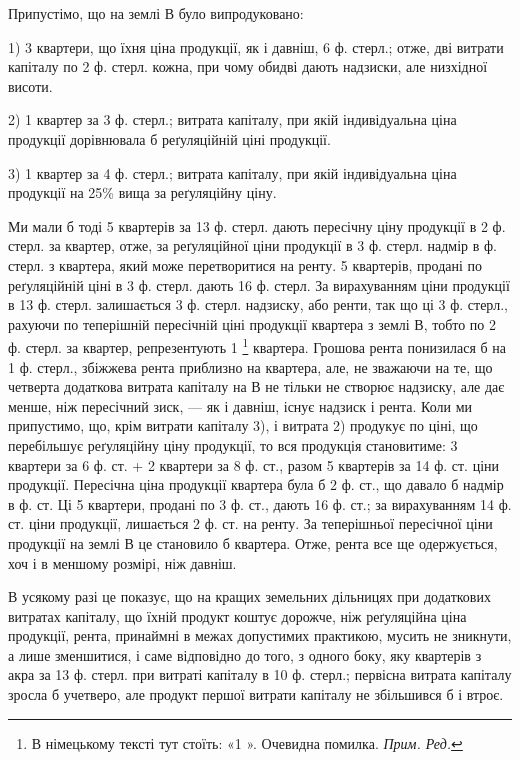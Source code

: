Припустімо, що на землі В було випродуковано:

1) 3  квартери, що їхня ціна продукції, як і давніш, 6 ф. стерл.; отже,
дві витрати капіталу по  2  ф. стерл. кожна, при чому обидві дають надзиски,
але низхідної висоти.

2) 1 квартер за 3 ф. стерл.; витрата капіталу, при якій індивідуальна
ціна продукції дорівнювала б реґуляційній ціні продукції.

3) 1 квартер за 4 ф. стерл.; витрата капіталу, при якій індивідуальна
ціна продукції на 25\% вища за реґуляційну ціну.

Ми мали б тоді 5  квартерів за 13 ф. стерл. дають пересічну ціну продукції в 2  ф. стерл.
за квартер, отже, за реґуляційної ціни продукції в 3 ф. стерл. надмір
в  ф. стерл. з квартера, який може перетворитися на ренту. 5  квартерів,
продані по реґуляційній ціні в 3 ф. стерл. дають 16  ф. стерл. За вирахуванням
ціни продукції в 13 ф. стерл. залишається 3  ф. стерл. надзиску, або
ренти, так що ці 3  ф. стерл., рахуючи по теперішній пересічній ціні продукції
квартера з землі В, тобто по 2  ф. стерл. за квартер, репрезентують
1  \footnote*{
В німецькому тексті тут стоїть: «1 ». Очевидна помилка. \emph{Прим. Ред.}
} квартера. Грошова рента понизилася б на 1 ф. стерл., збіжжева
рента приблизно на  квартера, але, не зважаючи на те, що четверта додаткова
витрата капіталу на В не тільки не створює надзиску, але дає менше, ніж
пересічний зиск, — як і давніш, існує надзиск і рента. Коли ми припустимо, що,
крім витрати капіталу 3), і витрата 2) продукує по ціні, що перебільшує реґуляційну
ціну продукції, то вся продукція становитиме: 3  квартери за
6 ф. ст. + 2 квартери за 8 ф. ст., разом 5  квартерів за 14 ф. ст. ціни продукції.
Пересічна ціна продукції квартера була б 2   ф. ст., що давало б надмір
в  ф. ст. Ці  5   квартери, продані по 3 ф. ст., дають 16  ф. ст.; за вирахуванням
14 ф. ст. ціни продукції, лишається 2  ф. ст. на ренту. За теперішньої
пересічної ціни продукції на землі В це становило б  квартера. Отже, рента
все ще одержується, хоч і в меншому розмірі, ніж давніш.

В усякому разі це показує, що на кращих земельних дільницях при додаткових
витратах капіталу, що їхній продукт коштує дорожче, ніж реґуляційна
ціна продукції, рента, принаймні в межах допустимих практикою, мусить не
зникнути, а лише зменшитися, і саме відповідно до того, з одного боку, яку
 квартерів з акра за 13 ф. стерл. при витраті капіталу
в 10 ф. стерл.; первісна витрата капіталу зросла б учетверо, але продукт
першої витрати капіталу не збільшився б і втроє.
\parbreak{}  %
